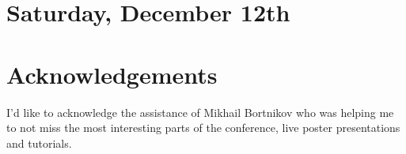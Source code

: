 \documentclass[11pt]{article}
\begin{document}
\newpage
\section{Saturday, December 12th}


\section{Acknowledgements}
I’d like to acknowledge the assistance of Mikhail Bortnikov who was helping me to not miss the most interesting parts of the conference, live poster presentations and tutorials. 


\newpage


\end{document}
